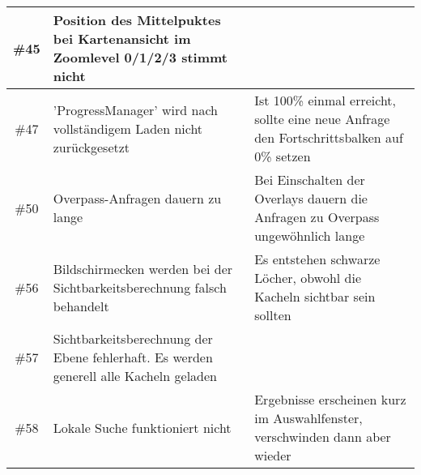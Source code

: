 \documentclass[10pt]{scrreprt}
\begin{document}
\begin{longtable}{|c|p{5.2cm}|p{8.2cm}|}
\hline
\#45 & Position des Mittelpuktes bei Kartenansicht im Zoomlevel 0/1/2/3 stimmt nicht & \\
\hline
\#47 & 'ProgressManager' wird nach vollständigem Laden nicht zurückgesetzt & Ist 100\% einmal erreicht, sollte eine neue Anfrage den Fortschrittsbalken auf 0\% setzen \\
\hline
\#50 & Overpass-Anfragen dauern zu lange & Bei Einschalten der Overlays dauern die Anfragen zu Overpass ungewöhnlich lange \\
\hline
\#56 & Bildschirmecken werden bei der Sichtbarkeitsberechnung falsch behandelt & Es entstehen schwarze Löcher, obwohl die Kacheln sichtbar sein sollten \\
\hline
\#57 & Sichtbarkeitsberechnung der Ebene fehlerhaft. Es werden generell alle Kacheln geladen & \\
\hline
\#58 & Lokale Suche funktioniert nicht & Ergebnisse erscheinen kurz im Auswahlfenster, verschwinden dann aber wieder \\
\hline
\end{longtable}
\end{document}
